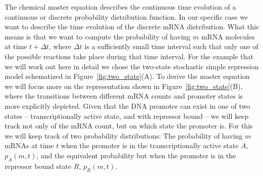 The chemical master equation describes the continuous time evolution of a
continuous or discrete probability distribution function. In our specific case
we want to describe the time evolution of the discrete mRNA distribution. What
this means is that we want to compute the probability of having $m$ mRNA
molecules at time $t + \Delta t$, where $\Delta t$ is a sufficiently small time
interval such that only one of the possible reactions take place during that time interval. For the
example that we will work out here in detail we chose the two-state stochastic
simple repression model schematized in Figure~\ref{fig:two_state}(A). To derive
the master equation we will focus more on the representation shown in
Figure~\ref{fig:two_state}(B), where the transitions between different mRNA
counts and promoter states is more explicitly depicted. Given that the DNA
promoter can exist in one of two states -- transcriptionally active state, and
with repressor bound -- we will keep track not only of the mRNA count, but on
which state the promoter is. For this we will keep track of two probability
distributions: The probability of having $m$ mRNAs at time $t$ when the promoter
is in the transcriptionally active state $A$, $p_A(m, t)$, and the equivalent
probability but when the promoter is in the repressor bound state $R$, $p_R(m,
t)$.

